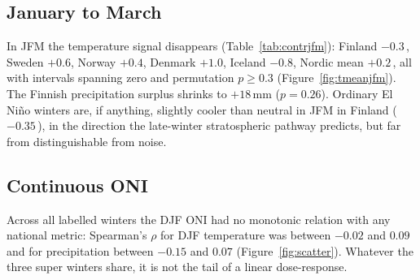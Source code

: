 \subsection{January to March}
In JFM the temperature signal disappears (Table~\ref{tab:contrjfm}): Finland $-0.3$\,\degC, Sweden $+0.6$, Norway $+0.4$, Denmark $+1.0$, Iceland $-0.8$, Nordic mean $+0.2$\,\degC, all with intervals spanning zero and permutation $p \ge 0.3$ (Figure~\ref{fig:tmeanjfm}). The Finnish precipitation surplus shrinks to $+18$\,mm ($p = 0.26$). Ordinary El Niño winters are, if anything, slightly cooler than neutral in JFM in Finland ($-0.35$\,\degC), in the direction the late-winter stratospheric pathway predicts, but far from distinguishable from noise.

\subsection{Continuous ONI}
Across all labelled winters the DJF ONI had no monotonic relation with any national metric: Spearman's $\rho$ for DJF temperature was between $-0.02$ and $0.09$ and for precipitation between $-0.15$ and $0.07$ (Figure~\ref{fig:scatter}). Whatever the three super winters share, it is not the tail of a linear dose-response.
